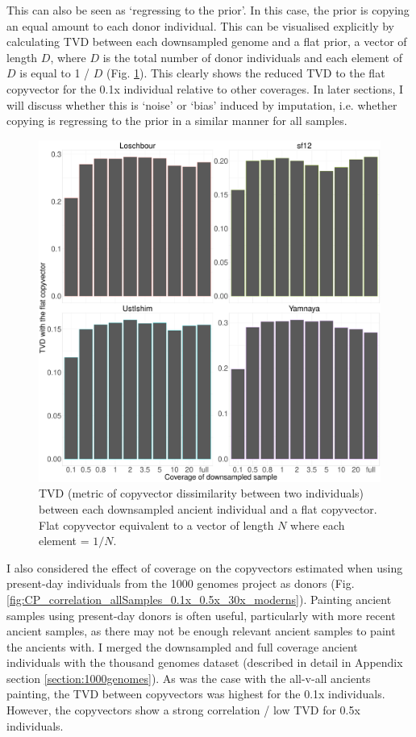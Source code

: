 {This can also be seen as `regressing to the prior'. In this case, the prior is copying an equal amount to each donor individual. This can be visualised explicitly by calculating TVD between each downsampled genome and a flat prior, a vector of length $D$, where $D$ is the total number of donor individuals and each element of $D$ is equal to 1 / $D$ (Fig. \ref{fig:TVD_ancients_flat_prior}). This clearly shows the reduced TVD to the flat copyvector for the 0.1x individual relative to other coverages. In later sections, I will discuss whether this is `noise' or `bias' induced by imputation, i.e.  whether copying is regressing to the prior in a similar manner for all samples. 

\begin{figure}[htp]
    \centering
    \includegraphics[width=1.0\textwidth]{../images/chapter1/TVD_ancients_flat_prior.pdf}
    \caption{TVD (metric of copyvector dissimilarity between two individuals) between each downsampled ancient individual and a flat copyvector. Flat copyvector equivalent to a vector of length $N$ where each element = $1/N$.}
    \label{fig:TVD_ancients_flat_prior}
\end{figure}

I also considered the effect of coverage on the copyvectors estimated when using present-day individuals from the 1000 genomes project as donors (Fig. \ref{fig:CP_correlation_allSamples_0.1x_0.5x_30x_moderns}). Painting ancient samples using present-day donors is often useful, particularly with more recent ancient samples, as there may not be enough relevant ancient samples to paint the ancients with. I merged the downsampled and full coverage ancient individuals with the thousand genomes dataset (described in detail in Appendix section \ref{section:1000genomes}). As was the case with the all-v-all ancients painting, the TVD between copyvectors was highest for the 0.1x individuals. However, the copyvectors show a strong correlation / low TVD for 0.5x individuals. 

}

